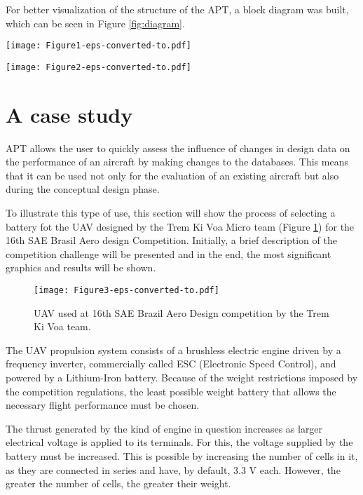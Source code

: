 \documentclass[10pt]{SelfArx} %
\begin{document}
For better visualization of the  structure of the APT, a block diagram was built, which can be seen in Figure \ref{fig:diagram}. 
\begin{figure*}[ht]
	\centering
	\texttt{[image: Figure1-eps-converted-to.pdf]}
	\caption{Graphic interface.}
	\label{fig:interface}
\end{figure*}
\begin{figure*}[htb]
	\centering
	\texttt{[image: Figure2-eps-converted-to.pdf]}
	\caption{Block diagram.}
    	\label{fig:diagram}
\end{figure*}



\section{A case study}
APT allows the user to quickly assess the influence of changes in design data on the performance of an aircraft by making changes to the databases. This means that it can be used not only for the evaluation of an existing aircraft but also during the conceptual design phase. 

To illustrate this type of use, this section will show the process of selecting a battery fot the UAV designed  by the Trem Ki Voa Micro team (Figure \ref{fig:aero}) for the 16th SAE Brasil Aero design Competition. Initially, a brief description of the competition challenge will be presented and in the end, the most significant graphics and results will be shown.
\begin{figure}
	\centering
	\texttt{[image: Figure3-eps-converted-to.pdf]}
	\caption{UAV used at 16th SAE Brazil Aero Design competition by the Trem Ki Voa team.}
	\label{fig:aero}
\end{figure}

The UAV propulsion system consists of a brushless electric engine driven by a frequency inverter, commercially called ESC ({Electronic Speed Control}), and powered by a Lithium-Iron battery. Because  of the weight restrictions imposed by the competition regulations, the least possible weight battery that allows the necessary flight performance must be chosen.

The thrust generated by the kind of engine in question increases as larger electrical voltage is applied to its terminals. For this, the voltage supplied by the battery must be increased. This is possible by increasing the number of cells in it, as they are connected in series and have, by default, 3.3 V each. However, the greater the number of cells, the greater their weight.
\end{document}
